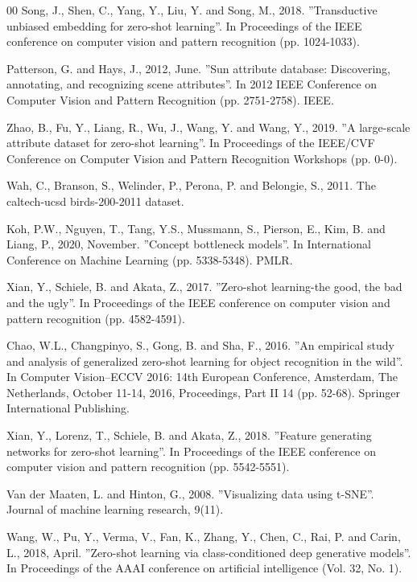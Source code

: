 \documentclass{article}
\begin{document}
\begin{thebibliography}{00}
 Song, J., Shen, C., Yang, Y., Liu, Y. and Song, M., 2018. ''Transductive unbiased embedding for zero-shot learning''. In Proceedings of the IEEE conference on computer vision and pattern recognition (pp. 1024-1033).

 Patterson, G. and Hays, J., 2012, June. ''Sun attribute database: Discovering, annotating, and recognizing scene attributes''. In 2012 IEEE Conference on Computer Vision and Pattern Recognition (pp. 2751-2758). IEEE.

 Zhao, B., Fu, Y., Liang, R., Wu, J., Wang, Y. and Wang, Y., 2019. ''A large-scale attribute dataset for zero-shot learning''. In Proceedings of the IEEE/CVF Conference on Computer Vision and Pattern Recognition Workshops (pp. 0-0).

 Wah, C., Branson, S., Welinder, P., Perona, P. and Belongie, S., 2011. The caltech-ucsd birds-200-2011 dataset.

 Koh, P.W., Nguyen, T., Tang, Y.S., Mussmann, S., Pierson, E., Kim, B. and Liang, P., 2020, November. ''Concept bottleneck models''. In International Conference on Machine Learning (pp. 5338-5348). PMLR.

 Xian, Y., Schiele, B. and Akata, Z., 2017. ''Zero-shot learning-the good, the bad and the ugly''. In Proceedings of the IEEE conference on computer vision and pattern recognition (pp. 4582-4591).

 Chao, W.L., Changpinyo, S., Gong, B. and Sha, F., 2016. ''An empirical study and analysis of generalized zero-shot learning for object recognition in the wild''. In Computer Vision–ECCV 2016: 14th European Conference, Amsterdam, The Netherlands, October 11-14, 2016, Proceedings, Part II 14 (pp. 52-68). Springer International Publishing.

 Xian, Y., Lorenz, T., Schiele, B. and Akata, Z., 2018. ''Feature generating networks for zero-shot learning''. In Proceedings of the IEEE conference on computer vision and pattern recognition (pp. 5542-5551).

 Van der Maaten, L. and Hinton, G., 2008. ''Visualizing data using t-SNE''. Journal of machine learning research, 9(11).

 Wang, W., Pu, Y., Verma, V., Fan, K., Zhang, Y., Chen, C., Rai, P. and Carin, L., 2018, April. ''Zero-shot learning via class-conditioned deep generative models''. In Proceedings of the AAAI conference on artificial intelligence (Vol. 32, No. 1).


\end{thebibliography}
\end{document}
